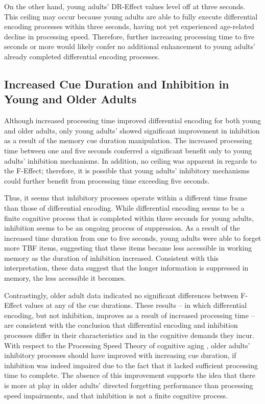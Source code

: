 \documentclass[man]{apa6}
\begin{document}
On the other hand, young adults’ DR-Effect values level off at three seconds. This ceiling may occur because young adults are able to fully execute differential encoding processes within three seconds, having not yet experienced age-related decline in processing speed. Therefore, further increasing processing time to five seconds or more would likely confer no additional enhancement to young adults’ already completed differential encoding processes.

\subsection*{Increased Cue Duration and Inhibition in Young and Older Adults}

Although increased processing time improved differential encoding for both young and older adults, only young adults’ showed significant improvement in inhibition as a result of the memory cue duration manipulation. The increased processing time between one and five seconds conferred a significant benefit only to young adults’ inhibition mechanisms. In addition, no ceiling was apparent in regards to the F-Effect; therefore, it is possible that young adults’ inhibitory mechanisms could further benefit from processing time exceeding five seconds.

Thus, it seems that inhibitory processes operate within a different time frame than those of differential encoding. While differential encoding seems to be a finite cognitive process that is completed within three seconds for young adults, inhibition seems to be an ongoing process of suppression. As a result of the increased time duration from one to five seconds, young adults were able to forget more TBF items, suggesting that these items became less accessible in working memory as the duration of inhibition increased. Consistent with this interpretation, these data suggest that the longer information is suppressed in memory, the less accessible it becomes.

Contrastingly, older adult data indicated no significant differences between F-Effect values at any of the cue durations. These results – in which differential encoding, but not inhibition, improves as a result of increased processing time – are consistent with the conclusion that differential encoding and inhibition processes differ in their characteristics and in the cognitive demands they incur. With respect to the Processing Speed Theory of cognitive aging \parencite{salthouse1996}, older adults’ inhibitory processes should have improved with increasing cue duration, if inhibition was indeed impaired due to the fact that it lacked sufficient processing time to complete. The absence of this improvement supports the idea that there is more at play in older adults’ directed forgetting performance than processing speed impairments, and that inhibition is not a finite cognitive process.
\end{document}
